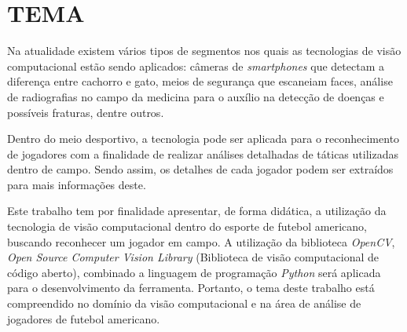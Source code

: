 \chapter{TEMA}
\label{chapter:introducao}

Na atualidade existem vários tipos de segmentos nos quais as tecnologias de visão computacional estão sendo aplicados: câmeras de \textit{smartphones} que detectam a diferença entre cachorro e gato, meios de segurança que escaneiam faces, análise de radiografias no campo da medicina para o auxílio na detecção de doenças e possíveis fraturas, dentre outros.

Dentro do meio desportivo, a tecnologia pode ser aplicada para o reconhecimento de jogadores com a finalidade de realizar análises detalhadas de táticas utilizadas dentro de campo. Sendo assim, os detalhes de cada jogador podem ser extraídos para mais informações deste.

Este trabalho tem por finalidade apresentar, de forma didática, a utilização da tecnologia de visão computacional dentro do esporte de futebol americano, buscando reconhecer um jogador em campo. A utilização da biblioteca \textit{OpenCV}, \textit{Open Source Computer Vision Library} (Biblioteca de visão computacional de código aberto), combinado a linguagem de programação \textit{Python} será aplicada para o desenvolvimento da ferramenta. Portanto, o tema deste trabalho está compreendido no domínio da visão computacional e na área de análise de jogadores de futebol americano.
